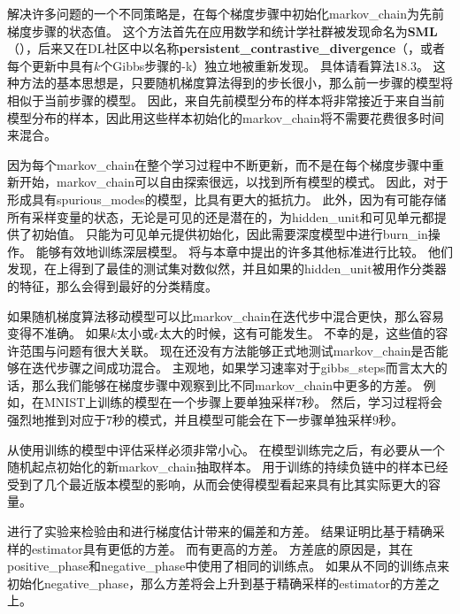 解决许多问题的一个不同策略是，在每个梯度步骤中初始化\gls{markov_chain}为先前梯度步骤的状态值。
这个方法首先在应用数学和统计学社群被发现命名为\textbf{\gls{SML}}（）\citep{Younes98onthe}，后来又在\gls{DL}社区中以名称\textbf{\gls{persistent_contrastive_divergence}}（，或者每个更新中具有$k$个Gibbs步骤的-k）独立地被重新发现\citep{Tieleman08-small}。
具体请看算法18.3。
这种方法的基本思想是，只要随机梯度算法得到的步长很小，那么前一步骤的模型将相似于当前步骤的模型。
因此，来自先前模型分布的样本将非常接近于来自当前模型分布的样本，因此用这些样本初始化的\gls{markov_chain}将不需要花费很多时间来混合。


因为每个\gls{markov_chain}在整个学习过程中不断更新，而不是在每个梯度步骤中重新开始，\gls{markov_chain}可以自由探索很远，以找到所有模型的模式。
因此，对于形成具有\gls{spurious_modes}的模型，比具有更大的抵抗力。
此外，因为有可能存储所有采样变量的状态，无论是可见的还是潜在的，为\gls{hidden_unit}和可见单元都提供了初始值。
只能为可见单元提供初始化，因此需要深度模型中进行\gls{burn_in}操作。
能够有效地训练深层模型。
\cite{Marlin10Inductive-small}将与本章中提出的许多其他标准进行比较。
他们发现，在上得到了最佳的测试集对数似然，并且如果的\gls{hidden_unit}被用作分类器的特征，那么会得到最好的分类精度。


如果随机梯度算法移动模型可以比\gls{markov_chain}在迭代步中混合更快，那么容易变得不准确。
如果$k$太小或$\epsilon$太大的时候，这有可能发生。
不幸的是，这些值的容许范围与问题有很大关联。
现在还没有方法能够正式地测试\gls{markov_chain}是否能够在迭代步骤之间成功混合。
主观地，如果学习速率对于\gls{gibbs_steps}而言太大的话，那么我们能够在梯度步骤中观察到比不同\gls{markov_chain}中更多的方差。
例如，在MNIST上训练的模型在一个步骤上要单独采样$7$秒。 
然后，学习过程将会强烈地推到对应于$7$秒的模式，并且模型可能会在下一步骤单独采样$9$秒。


从使用训练的模型中评估采样必须非常小心。
在模型训练完之后，有必要从一个随机起点初始化的新\gls{markov_chain}抽取样本。
用于训练的持续负链中的样本已经受到了几个最近版本模型的影响，从而会使得模型看起来具有比其实际更大的容量。



\cite{BerglundR13}进行了实验来检验由和进行梯度估计带来的偏差和方差。
结果证明比基于精确采样的\gls{estimator}具有更低的方差。
而有更高的方差。
方差底的原因是，其在\gls{positive_phase}和\gls{negative_phase}中使用了相同的训练点。
如果从不同的训练点来初始化\gls{negative_phase}，那么方差将会上升到基于精确采样的\gls{estimator}的方差之上。


